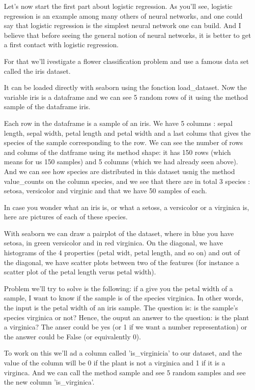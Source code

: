 \documentclass{article}
\begin{document}
Let's now start the first part about logistic regression.
As you'll see, logistic regression is an example among 
many others of neural networks, and one could say that 
logistic regression is the simplest neural network one can build.
And I believe that before seeing the general notion of neural networks, 
it is better to get a first contact with logistic regression. 


For that we'll ivestigate a  flower classification problem and use  
a famous data set called the iris dataset.

It can be loaded directly with seaborn using the fonction load\_dataset.
Now the variable iris is a dataframe and we can  see 5 random rows of it 
using the method sample of the dataframe iris.

Each row in the dataframe is a sample of an iris.
We have 5 columns : sepal length, sepal width, petal length and petal width and 
a last colums that gives the species of the sample 
corresponding to the row.
We can see the number of rows and colums  of the datframe using its method shape: 
it has 150 rows (which means for us 150 samples) 
and 5 columns (which we had already seen above). 
And we can see how species are distributed in this dataset usnig the 
method value\_counts on the column species, 
and we see that there are in total 3 species : setosa, versicolor and virginic and that we have 50 samples of each.

In case you wonder what an iris is, or what a setoss, a versicolor or a virginica is, here are pictures of
each of these species.

With seaborn we can draw a pairplot of
the dataset, 
where in blue you have setosa, in green versicolor and in red virginica. 
On the diagonal, we have histograms of the 4 properties 
(petal widt, petal length, and so on) and 
out of the diagonal, we have scatter plots between two 
of the features (for instance a scatter plot of the petal length verus petal width).

Problem we'll try to solve is the following: 
if a give you the petal width of a sample, 
I want to know if the sample is of the species virginica.
In other words, the  input is  the petal width of 
an iris sample.
The question is: is the sample's species virginica or not?
Hence, the ouput an answer to the question: is the plant a virginica?
The anser could be yes (or 1 if we want a number representation) or the answer 
could be False (or equivalently 0).

To work on this we'll ad a column called 'is\_virginicia' to our dataset, and the value of the column will be 
0 if the plant is not a virginica and 1 if it is  a virginca.
And we can call the method sample and see 5 random samples and
see the new column 'is\_virginica'.
\end{document}
